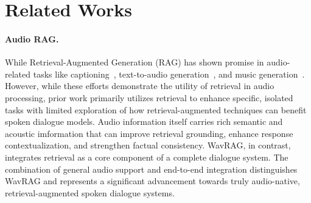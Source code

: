 \section{Related Works}
\paragraph{Audio RAG.}
While Retrieval-Augmented Generation (RAG) has shown promise in audio-related tasks like captioning~\cite{koizumi2020audiocaptioningusingpretrained,zhao-etal-2023-generating}, text-to-audio generation~\cite{huang2023makeanaudiotexttoaudiogenerationpromptenhanced}, and music generation~\cite{gonzales-rudzicz-2024-retrieval}. However, while these efforts demonstrate the utility of retrieval in audio processing,  prior work primarily utilizes retrieval to enhance specific, isolated tasks with limited exploration of how retrieval-augmented techniques can benefit spoken dialogue models. Audio information itself carries rich semantic and acoustic imformation that can improve retrieval grounding, enhance response contextualization, and strengthen factual consistency. WavRAG, in contrast, integrates retrieval as a core component of a complete dialogue system. The combination of general audio support and end-to-end integration distinguishes WavRAG and represents a significant advancement towards truly audio-native, retrieval-augmented spoken dialogue systems.


